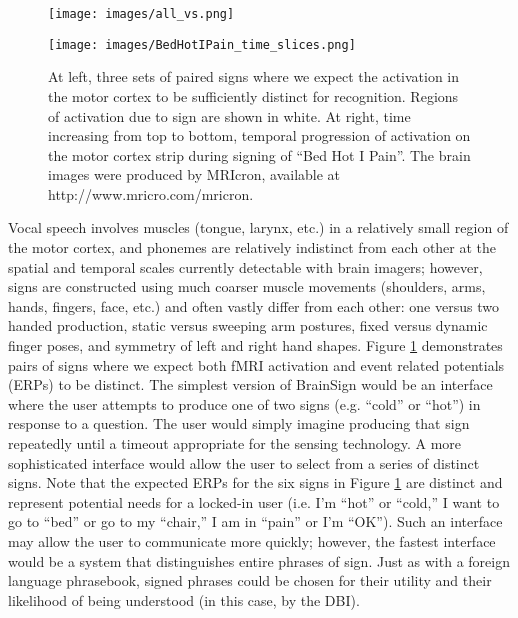 \documentclass{proposal}
\begin{document}
\begin{figure}[ht]
\begin{minipage}[t]{120mm}
\begin{center}
\texttt{[image: images/all\_vs.png]}
\end{center}
\end{minipage}
\hfill
\begin{minipage}[t]{35mm}
\begin{center}
\texttt{[image: images/BedHotIPain\_time\_slices.png]}
\end{center}
\end{minipage}
\caption{\label{fig:brainsign} At left, three sets of paired signs where we expect the activation in the motor cortex to be sufficiently distinct for recognition. Regions of activation due to sign are shown in white. At right, time increasing from top to bottom, temporal progression of activation on the motor cortex strip during signing of ``Bed Hot I Pain''. The brain images were produced by MRIcron, available at http://www.mricro.com/mricron.}
\end{figure}


Vocal speech involves muscles (tongue, larynx, etc.) in a relatively small region of the motor cortex, and phonemes are relatively indistinct from each other at the spatial and temporal scales currently detectable with brain imagers; however, signs are constructed using much coarser muscle movements (shoulders, arms, hands, fingers, face, etc.) and often vastly differ from each other: one versus two handed production, static versus sweeping arm postures, fixed versus dynamic finger poses, and symmetry of left and right hand shapes.  Figure \ref{fig:brainsign} demonstrates pairs of signs where we expect both fMRI activation and event related potentials (ERPs) to be distinct.  The simplest version of BrainSign would be an interface where the user attempts to produce one of two signs (e.g. ``cold'' or ``hot'') in response to a question.  The user would simply imagine producing that sign repeatedly until a timeout appropriate for the sensing technology.  A more sophisticated interface would allow the user to select from a series of distinct signs.  Note that the expected ERPs for the six signs in Figure \ref{fig:brainsign} are distinct and represent potential needs for a locked-in user (i.e. I'm ``hot'' or ``cold,'' I want to go to ``bed'' or go to my ``chair,'' I am in ``pain'' or I'm ``OK'').  Such an interface may allow the user to communicate more quickly; however, the fastest interface would be a system that distinguishes entire phrases of sign. Just as with a foreign language phrasebook, signed phrases could be chosen for their utility and their likelihood of being understood (in this case, by the DBI).
\end{document}
